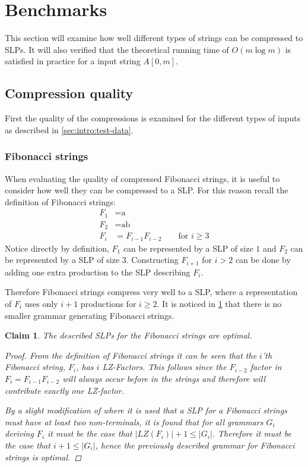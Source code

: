 \documentclass[twoside,11pt,openright]{report}
\newcommand{\str}[3]{#1[#2, #3]}
\newtheorem{claim}{Claim}
\begin{document}
\clearpage
\section{Benchmarks}
\label{sec:compression:benchmarks}
This section will examine how well different types of strings can be compressed to SLPs. It will also verified that the theoretical running time of $O(m\log{m})$ is satisfied in practice for a input string $\str{A}{0}{m}$.

\subsection{Compression quality}
First the quality of the compressions is examined for the different types of inputs as described in \cref{sec:intro:test-data}.

\subsubsection{Fibonacci strings}
\label{sec:compressing-Fibonacci-strings}
When evaluating the quality of compressed Fibonacci strings, it is useful to consider how well they can be compressed to a SLP. For this reason recall the definition of Fibonacci strings:
\begin{align*}
  F_1 &= \text{a} \\
  F_2 &= \text{ab} \\
  F_{i} &= F_{i - 1} F_{i - 2} \quad\quad \text{for } i \geq 3
\end{align*}
Notice directly by definition, $F_1$ can be represented by a SLP of size $1$ and $F_2$ can be represented by a SLP of size $3$. Constructing $F_{i + 1}$ for $i > 2$ can be done by adding one extra production to the SLP describing $F_{i}$.

Therefore Fibonacci strings compress very well to a SLP, where a representation of $F_{i}$ uses only $i + 1$ productions for $i \geq 2$. It is noticed in \cref{claim:fib-slp-optimal} that there is no smaller grammar generating Fibonacci strings.

\begin{claim}
  \label{claim:fib-slp-optimal}
  The described SLPs for the Fibonacci strings are optimal.
  \begin{proof}
    From the definition of Fibonacci strings it can be seen that the $i$'th Fibonacci string, $F_i$, has $i$ LZ-Factors. This follows since the $F_{i-2}$ factor in $F_i = F_{i - 1} F_{i - 2}$ will always occur before in the strings and therefore will contribute exactly one LZ-factor.

    By a slight modification of \cite[Theorem 1]{Rytter2003211} where it is used that a SLP for a Fibonacci strings must have at least two non-terminals, it is found that for all grammars $G_i$ deriving $F_i$ it must be the case that $|LZ(F_i)| + 1 \leq |G_i|$. Therefore it must be the case that $i + 1 \leq |G_i|$, hence the previously described grammar for Fibonacci strings is optimal.
  \end{proof}
\end{claim}
\end{document}
